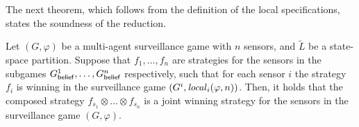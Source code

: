 The next theorem, which follows  from the definition of the local specifications, states the soundness of the reduction.

\begin{theorem}\label{thm:soundnes}
Let  $(G,\varphi)$ be a multi-agent surveillance game with $n$ sensors, and $\widetilde{L}$ be a state-space partition. Suppose that $f_1,\ldots,f_n$ are strategies for the sensors in the subgames $G^1_{\mathsf{belief}},\ldots,G^n_{\mathsf{belief}}$ respectively, such that for each sensor $i$ the strategy $f_i$ is winning in the surveillance game $(G^i,\mathit{local}_i(\varphi,n))$. Then, it holds that the composed strategy $f_{s_1}\otimes\ldots\otimes f_{s_n}$ is a joint winning strategy for the sensors in the surveillance game $(G,\varphi)$.
\end{theorem}